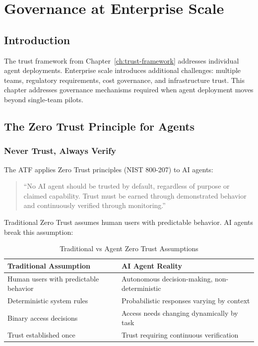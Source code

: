 \chapter{Governance at Enterprise Scale}
\label{ch:governance}


\section{Introduction}
\label{sec:governance-intro}

The trust framework from Chapter~\ref{ch:trust-framework} addresses individual agent deployments. Enterprise scale introduces additional challenges: multiple teams, regulatory requirements, cost governance, and infrastructure trust. This chapter addresses governance mechanisms required when agent deployment moves beyond single-team pilots.

\section{The Zero Trust Principle for Agents}
\label{sec:zero-trust-agents}

\subsection{Never Trust, Always Verify}
\label{subsec:never-trust}

The ATF applies Zero Trust principles (NIST 800-207) to AI agents:

\begin{quote}
``No AI agent should be trusted by default, regardless of purpose or claimed capability. Trust must be earned through demonstrated behavior and continuously verified through monitoring.''
\end{quote}

Traditional Zero Trust assumes human users with predictable behavior. AI agents break this assumption:

\begin{table}[htbp]
\centering
\caption{Traditional vs Agent Zero Trust Assumptions}
\label{tab:zero-trust-assumptions}
\begin{tabular}{ll}
\toprule
\textbf{Traditional Assumption} & \textbf{AI Agent Reality} \\
\midrule
Human users with predictable behavior & Autonomous decision-making, non-deterministic \\
Deterministic system rules & Probabilistic responses varying by context \\
Binary access decisions & Access needs changing dynamically by task \\
Trust established once & Trust requiring continuous verification \\
\bottomrule
\end{tabular}
\end{table}

